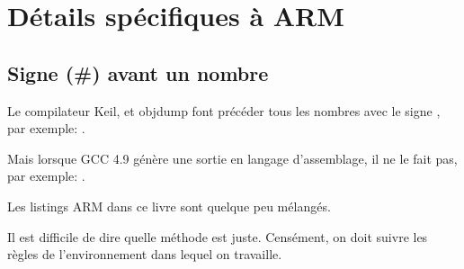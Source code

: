 ﻿\section{Détails spécifiques à ARM}

\subsection{Signe (\#) avant un nombre}

Le compilateur Keil, \IDA et objdump font précéder tous les nombres avec le signe
\q{\#}, par exemple:
.

Mais lorsque GCC 4.9 génère une sortie en langage d'assemblage, il ne le fait pas,
par exemple:
.

Les listings ARM dans ce livre sont quelque peu mélangés.

Il est difficile de dire quelle méthode est juste.
Censément, on doit suivre les règles de l'environnement dans lequel on travaille.




